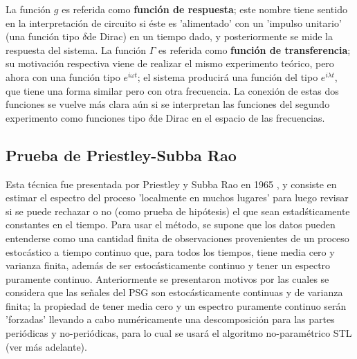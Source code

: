\documentclass[12pt,a4paper]{mitthesis}
\newcommand{\ddd}{$\delta$}
\begin{document}
La funci\'on $g$ es referida como \textbf{funci\'on de respuesta}; este nombre tiene sentido en la
interpretaci\'on de circuito si \'este es 'alimentado' con un 'impulso unitario' (una funci\'on
tipo \ddd de Dirac) en un tiempo dado, y posteriormente se mide la respuesta del sistema.
La funci\'on $\Gamma$ es referida como \textbf{funci\'on de transferencia}; su motivaci\'on
respectiva viene de realizar el mismo experimento te\'orico, pero ahora con una funci\'on tipo 
$e^{i \omega t}$; el sistema producir\'a una funci\'on del tipo $e^{i\lambda t}$, que tiene una 
forma similar pero con otra frecuencia. La conexi\'on de estas dos funciones se vuelve m\'as clara 
a\'un si se interpretan las funciones del segundo experimento como funciones tipo \ddd de Dirac en 
el espacio de las frecuencias.


\subsection{Prueba de Priestley-Subba Rao}

Esta t\'ecnica fue presentada por Priestley y Subba Rao en 1965 \cite{Priestley69}, y
consiste en estimar el espectro del proceso 'localmente en muchos lugares' para luego 
revisar si se puede rechazar o no (como prueba de hip\'otesis) el que sean 
estad\'sticamente constantes en el tiempo.
Para usar el m\'etodo,
se supone que los datos pueden entenderse como una cantidad finita de observaciones provenientes de 
un proceso estoc\'astico a tiempo continuo que, para todos los tiempos, tiene media cero y varianza 
finita, adem\'as de ser estoc\'asticamente continuo y tener un espectro puramente continuo.
Anteriormente se presentaron motivos por las cuales se considera que las 
se\~nales del PSG son estoc\'asticamente continuas y de varianza finita; la propiedad de tener 
media cero y un espectro puramente continuo ser\'an 'forzadas' llevando a cabo num\'ericamente
una descomposici\'on 
para las partes peri\'odicas 
y no-peri\'odicas, para lo cual se usar\'a el algoritmo no-param\'etrico STL (ver 
m\'as adelante).
\end{document}
